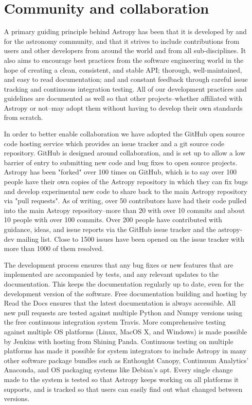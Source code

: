 \documentclass[11pt,twoside]{article}
\begin{document}
\section{Community and collaboration}

A primary guiding principle behind Astropy has been that it is developed by
and for the astronomy community, and that it strives to include contributions
from users and other developers from around the world and from all
sub-disciplines.  It also aims to encourage best practices from the software
engineering world in the hope of creating a clean, consistent, and stable API;
thorough, well-maintained, and easy to read documentation; and and constant
feedback through careful issue tracking and continuous integration testing.
All of our development practices and guidelines are documented as well so that
other projects--whether affiliated with Astropy or not--may adopt them without
having to develop their own standards from scratch.

In order to better enable collaboration we have adopted the GitHub open source
code hosting service which provides an issue tracker and a git source code
repository.  GitHub is designed around collaboration, and is set up to allow a
low barrier of entry to submitting new code and bug fixes to open source
projects.  Astropy has been "forked" over 100 times on GitHub, which is to say
over 100 people have their own copies of the Astropy repository in which they
can fix bugs and develop experimental new code to share back to the main
Astropy repository via "pull requests".  As of writing, over 50 contributors
have had their code pulled into the main Astropy repository--more than 20 with
over 10 commits and about 10 people with over 100 commits.  Over 200 people
have contributed with guidance, ideas, and issue reports via the GitHub issue
tracker and the astropy-dev mailing list.  Close to 1500 issues have been
opened on the issue tracker with more than 1000 of them resolved.

The development process ensures that any bug fixes or new features that are
implemented are accompanied by tests, and any relevant updates to the
documentation.  This keeps the documentation regularly up to date, even for the
development version of the software.  Free documentation building and hosting
by Read the Docs ensures that the latest documentation is always accessible.
All new pull requests are tested against multiple Python and Numpy versions
using the free continuous integration system Travis.  More comprehensive
testing against multiple OS platforms (Linux, MacOS X, and Windows) is made
possible by Jenkins with hosting from Shining Panda.  Continuous testing on
multiple platforms has made it possible for system integrators to include
Astropy in many other software package bundles such as Enthought Canopy,
Continuum Analytics' Anaconda, and OS packaging systems like Debian's apt.
Every single change made to the system is tested so that Astropy keeps working
on all platforms it supports, and is tracked so that users can easily find out
what changed between versions.
\end{document}
